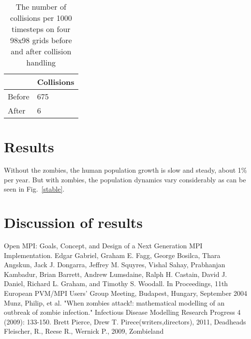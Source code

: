 \documentclass{report}
\begin{document}
\begin{table}
\centering
\begin{tabular}{|l|l|}
\hline
& Collisions\\
\hline
Before & 675\\
\hline
After & 6\\
\hline
\end{tabular}
\caption{The number of collisions per 1000 timesteps on four 98x98 grids before and after collision handling}
\label{collsions}
\end{table}




\section{Results}


Without the zombies, the human population growth is slow and steady, about 1\% per year. But with zombies, the population dynamics vary considerably as can be seen in Fig.~\ref{stable}.



\section{Discussion of results}

\begin{thebibliography}{99}
Open MPI: Goals, Concept, and Design of a Next Generation MPI Implementation. Edgar Gabriel, Graham E. Fagg, George Bosilca, Thara Angskun, Jack J. Dongarra, Jeffrey M. Squyres, Vishal Sahay, Prabhanjan Kambadur, Brian Barrett, Andrew Lumsdaine, Ralph H. Castain, David J. Daniel, Richard L. Graham, and Timothy S. Woodall. In Proceedings, 11th European PVM/MPI Users' Group Meeting, Budapest, Hungary, September 2004
Munz, Philip, et al. "When zombies attack!: mathematical modelling of an outbreak of zombie infection." Infectious Disease Modelling Research Progress 4 (2009): 133-150.
Brett Pierce, Drew T. Pirece(writers,directors), 2011, Deadheads
Fleischer, R., Reese R., Wernick P., 2009, Zombieland 
\end{thebibliography}
\end{document}

